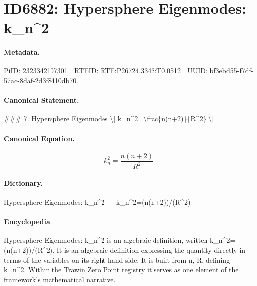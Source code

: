 \section*{ID6882: Hypersphere Eigenmodes: k\_n\textasciicircum{}2}
\paragraph{Metadata.}
PiID: 2323342107301 | RTEID: RTE:P26724.3343:T0.0512 | UUID: bf3ebd55-f7df-57ac-8daf-2d3f8410db70

\paragraph{Canonical Statement.}
\#\#\# 7. Hypersphere Eigenmodes \textbackslash{}[ k\_n\textasciicircum{}2=\textbackslash{}frac\{n(n+2)\}\{R\textasciicircum{}2\} \textbackslash{}]

\paragraph{Canonical Equation.}
\[
k_n^2=\frac{n(n+2)}{R^2}
\]

\paragraph{Dictionary.}
Hypersphere Eigenmodes: k\_n\textasciicircum{}2 — k\_n\textasciicircum{}2=(n(n+2))/(R\textasciicircum{}2)

\paragraph{Encyclopedia.}
Hypersphere Eigenmodes: k\_n\textasciicircum{}2 is an algebraic definition, written k\_n\textasciicircum{}2=(n(n+2))/(R\textasciicircum{}2). It is an algebraic definition expressing the quantity directly in terms of the variables on its right-hand side. It is built from n, R, defining k\_n\textasciicircum{}2. Within the Trawin Zero Point registry it serves as one element of the framework's mathematical narrative.
